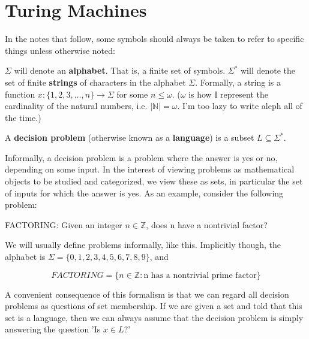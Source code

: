\section{Turing Machines}
In the notes that follow, some symbols should always be taken to refer to specific things unless otherwise noted:

$\Sigma$ will denote an \textbf{alphabet}. That is, a finite set of symbols. 
$\Sigma^*$ will denote the set of finite \textbf{strings} of characters in the alphabet $\Sigma$. Formally, a string is a function $x: \{1,2,3,\ldots,n\}\to \Sigma$ for some $n \leq \omega$. ($\omega$ is how I represent the cardinality of the natural numbers, i.e. $|\mathbb{N}| = \omega$. I'm too lazy to write aleph all of the time.)

\begin{definition}
A \textbf{decision problem} (otherwise known as a \textbf{language}) is a subset $L \subseteq \Sigma^*$.
\end{definition}

Informally, a decision problem is a problem where the answer is yes or no, depending on some input. In the interest of viewing problems as mathematical objects to be studied and categorized, we view these as sets, in particular the set of inputs for which the answer is yes. As an example, consider the following problem:

\begin{problem}
FACTORING: Given an integer $n \in \mathbb{Z}$, does n have a nontrivial factor?
\end{problem}

We will usually define problems informally, like this. Implicitly though, the alphabet is $\Sigma = \{0,1,2,3,4,5,6,7,8,9\}$, and

\[FACTORING = \{n\in\mathbb{Z}: \textrm{n has a nontrivial prime factor}\} \]

A convenient consequence of this formalism is that we can regard all decision problems as questions of set membership. If we are given a set and told that this set is a language, then we can always assume that the decision problem is simply answering the question 'Is $x\in L$?'

